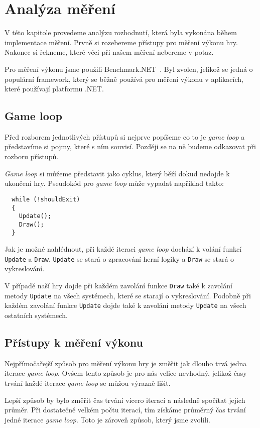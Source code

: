 \chapter{Analýza měření}
V této kapitole provedeme analýzu rozhodnutí, která byla vykonána během implementace měření. Prvně si rozebereme přístupy pro měření výkonu hry. Nakonec si řekneme, které věci při našem měření nebereme v potaz.

Pro měření výkonu jsme použili Benchmark.NET~\cite{BenchmarkDotNet}. Byl zvolen, jelikož se jedná o populární framework, který se běžně používá pro měření výkonu v aplikacích, které používají platformu .NET.

\section{Game loop}
Před rozborem jednotlivých přístupů si nejprve popíšeme co to je \textit{game loop} a představíme si pojmy, které s ním souvisí. Později se na ně budeme odkazovat při rozboru přístupů.

\textit{Game loop} si můžeme představit jako cyklus, který běží dokud nedojde k ukončení hry. Pseudokód pro \textit{game loop} může vypadat například takto:

\begin{verbatim}
  while (!shouldExit) 
  {
    Update();
    Draw();
  }
\end{verbatim}

Jak je možné nahlédnout, při každé iteraci \textit{game loop} dochází k volání funkcí \texttt{Update} a  \texttt{Draw}. \texttt{Update} se stará o zpracování herní logiky a \texttt{Draw} se stará o vykreslování.

V případě naší hry dojde při každém zavolání funkce \texttt{Draw} také k zavolání metody \texttt{Update} na všech systémech, které se starají o vykreslování. Podobně při každém zavolání funkce \texttt{Update} dojde také k zavolání metody \texttt{Update} na všech ostatních systémech.

\section{Přístupy k měření výkonu}
Nejpřímočařejší způsob pro měření výkonu hry je změřit jak dlouho trvá jedna iterace \textit{game loop}. Ovšem tento způsob je pro nás velice nevhodný, jelikož časy trvání každé iterace \textit{game loop} se můžou výrazně lišit.

Lepší způsob by bylo změřit čas trvání vícero iterací a následně spočítat jejich průměr. Při dostatečně velkém počtu iterací, tím získáme průměrný čas trvání jedné iterace \textit{game loop}. Toto je zároveň způsob, který jsme zvolili.

